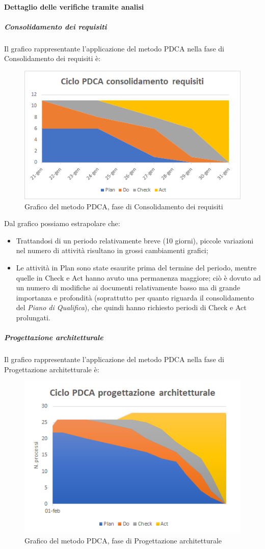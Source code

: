 \paragraph{Dettaglio delle verifiche tramite analisi}
\subparagraph{Consolidamento dei requisiti}\MiniSpazio
Il grafico rappresentante l'applicazione del metodo PDCA nella fase di Consolidamento dei requisiti è:
\begin{figure} [H]
	\centering
	\includegraphics[scale=1]{Img/Ciclo_PDCA_consolidamento_requisiti}
	\caption{Grafico del metodo PDCA, fase di Consolidamento dei requisiti}\label{}
\end{figure}
Dal grafico possiamo estrapolare che:
\begin{itemize}
	\item Trattandosi di un periodo relativamente breve (10 giorni), piccole variazioni nel numero di attività risultano in grossi cambiamenti grafici;
	\item Le attività in Plan sono state esaurite prima del termine del periodo, mentre quelle in Check e Act hanno avuto una permanenza maggiore; ciò è dovuto ad un numero di modifiche ai documenti relativamente basso ma di grande importanza e profondità (soprattutto per quanto riguarda il consolidamento del \emph{Piano di Qualifica}), che quindi hanno richiesto periodi di Check e Act prolungati.
\end{itemize}
\subparagraph{Progettazione architetturale}\MiniSpazio
Il grafico rappresentante l'applicazione del metodo PDCA nella fase di Progettazione architetturale è:
\begin{figure} [H]
	\centering
	\includegraphics[scale=1]{Img/Ciclo_PDCA_progettazione_architetturale}
	\caption{Grafico del metodo PDCA, fase di Progettazione architetturale}\label{}
\end{figure}
